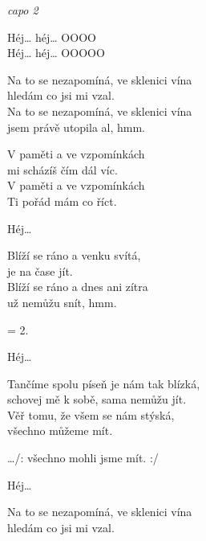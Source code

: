 
\re{}\textit{capo 2}

\re{}
 Héj\ldots{}  héj\ldots{} OOOO\\
 Héj\ldots{}  héj\ldots{} OOOOO

\ve{}
Na to se nezapomíná, ve sklenici vína\\
hledám co jsi mi vzal.\\
Na to se nezapomíná, ve sklenici vína\\
jsem právě utopila al, hmm.  \quad {} 

\ve{}
V paměti a ve vzpomínkách\\
mi scházíš čím dál víc.\\
V paměti a ve vzpomínkách\\
Ti pořád mám co říct.

\re{}
Héj\ldots

\ve{}
Blíží se ráno a venku svítá,\\
je na čase jít.\\
Blíží se ráno a dnes ani zítra\\
už nemůžu snít, hmm.

\ve{}
= 2.

\re{}
Héj\ldots

\cho{}
Tančíme spolu píseň je nám tak blízká,\\
schovej mě k sobě, sama nemůžu jít.\\
Věř tomu, že všem se nám stýská,\\
všechno můžeme mít. 

\cho{}\ldots{}/: všechno mohli jsme mít. :/

\re{}
Héj\ldots

\re{}
Na to se nezapomíná, ve sklenici vína\\
hledám co jsi mi vzal.

\esong{}